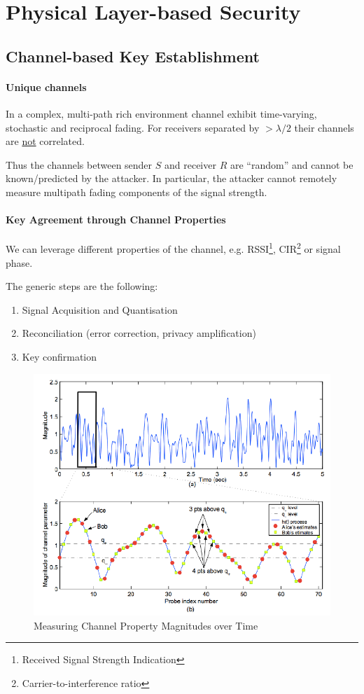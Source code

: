 \section{Physical Layer-based Security}


\subsection{Channel-based Key Establishment}

\paragraph{Unique channels}
In a complex, multi-path rich environment channel exhibit time-varying, stochastic and reciprocal fading.
For receivers separated by $> \lambda / 2$ their channels are \underline{not} correlated.

Thus the channels between sender $S$ and receiver $R$ are ``random'' and cannot be known/predicted by the attacker.
In particular, the attacker cannot remotely measure multipath fading components of the signal strength.

\paragraph{Key Agreement through Channel Properties}
We can leverage different properties of the channel, e.g. RSSI\footnote{Received Signal Strength Indication}, CIR\footnote{Carrier-to-interference ratio} or signal phase.

The generic steps are the following:
\begin{enumerate}
	\item Signal Acquisition and Quantisation
	\item Reconciliation (error correction, privacy amplification)
	\item Key confirmation
\end{enumerate}

\begin{figure}[h]
	\centering
	\includegraphics[scale=0.5]{images/7-channel-property.png}
	\caption{Measuring Channel Property Magnitudes over Time}
	\label{fig:channel-property}
\end{figure}

